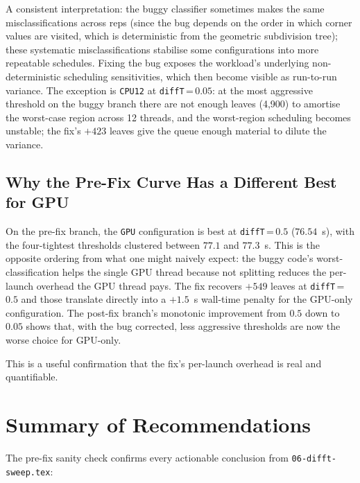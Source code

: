\documentclass[
	english,
	letterpaper, oneside
]{article}
\begin{document}
\noindent
A consistent interpretation: the buggy classifier sometimes makes the
same misclassifications across reps (since the bug depends on the
order in which corner values are visited, which is
deterministic from the geometric subdivision tree); these systematic
misclassifications stabilise some configurations into more repeatable
schedules. Fixing the bug exposes the workload's underlying
non-deterministic scheduling sensitivities, which then become visible
as run-to-run variance. The exception is \texttt{CPU12} at
\texttt{diffT}\,=\,$0.05$: at the most aggressive threshold on the
buggy branch there are not enough leaves (4{,}900) to amortise the
worst-case region across 12 threads, and the worst-region scheduling
becomes unstable; the fix's $+423$ leaves give the queue enough
material to dilute the variance.

\subsection{Why the Pre-Fix Curve Has a Different Best for GPU}

On the pre-fix branch, the \texttt{GPU} configuration is best at
\texttt{diffT}\,=\,$0.5$ ($76.54$~s), with the four-tightest
thresholds clustered between $77.1$ and $77.3$~s. This is the opposite
ordering from what one might naively expect: the buggy code's
worst-classification helps the single GPU thread because
not splitting reduces the per-launch overhead the GPU thread
pays. The fix recovers $+549$ leaves at \texttt{diffT}\,=\,$0.5$ and
those translate directly into a $+1.5$~s wall-time penalty for the
GPU-only configuration. The post-fix branch's monotonic improvement
from $0.5$ down to $0.05$ shows that, with the bug corrected,
less aggressive thresholds are now the worse choice for
GPU-only.

This is a useful confirmation that the fix's per-launch overhead is
real and quantifiable.

\section{Summary of Recommendations}

The pre-fix sanity check confirms every actionable conclusion from
\texttt{06-difft-sweep.tex}:
\end{document}
